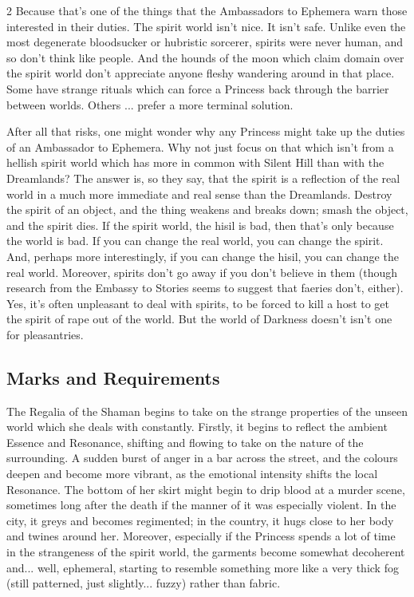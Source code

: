 \begin{multicols}{2}
Because that's one of the things that the Ambassadors to Ephemera warn those interested in their duties. The spirit world isn't nice. It isn't safe. Unlike even the most degenerate bloodsucker or hubristic sorcerer, spirits were never human, and so don't think like people. And the hounds of the moon which claim domain over the spirit world don't appreciate anyone fleshy wandering around in that place. Some have strange rituals which can force a Princess back through the barrier between worlds. Others ... prefer a more terminal solution.

After all that risks, one might wonder why any Princess might take up the duties of an Ambassador to Ephemera. Why not just focus on that which isn't from a hellish spirit world which has more in common with Silent Hill than with the Dreamlands? The answer is, so they say, that the spirit is a reflection of the real world in a much more immediate and real sense than the Dreamlands. Destroy the spirit of an object, and the thing weakens and breaks down; smash the object, and the spirit dies. If the spirit world, the hisil is bad, then that's only because the world is bad. If you can change the real world, you can change the spirit. And, perhaps more interestingly, if you can change the hisil, you can change the real world. Moreover, spirits don't go away if you don't believe in them (though research from the Embassy to Stories seems to suggest that faeries don't, either). Yes, it's often unpleasant to deal with spirits, to be forced to kill a host to get the spirit of rape out of the world. But the world of 
Darkness doesn't isn't one for pleasantries. 

\subsection*{Marks and Requirements}

The Regalia of the Shaman begins to take on the strange properties of the unseen world which she deals with constantly. Firstly, it begins to reflect the ambient Essence and Resonance, shifting and flowing to take on the nature of the surrounding. A sudden burst of anger in a bar across the street, and the colours deepen and become more vibrant, as the emotional intensity shifts the local Resonance. The bottom of her skirt might begin to drip blood at a murder scene, sometimes long after the death if the manner of it was especially violent. In the city, it greys and becomes regimented; in the country, it hugs close to her body and twines around her. Moreover, especially if the Princess spends a lot of time in the strangeness of the spirit world, the garments become somewhat decoherent and... well, ephemeral, starting to resemble something more like a very thick fog (still patterned, just slightly... fuzzy) rather than fabric.


\end{multicols}
